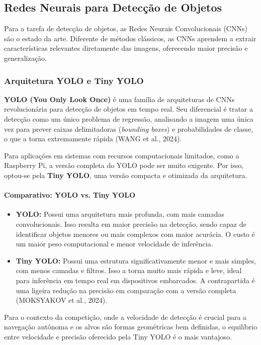 \documentclass{SBCbookchapter}
\begin{document}
\subsection{Redes Neurais para Detecção de Objetos}
Para a tarefa de detecção de objetos, as Redes Neurais Convolucionais (CNNs) são o estado da arte. Diferente de métodos clássicos, as CNNs aprendem a extrair características relevantes diretamente das imagens, oferecendo maior precisão e generalização.

\subsubsection{Arquitetura YOLO e Tiny YOLO}
\textbf{YOLO (You Only Look Once)} é uma família de arquiteturas de CNNs revolucionária para detecção de objetos em tempo real. Seu diferencial é tratar a detecção como um único problema de regressão, analisando a imagem uma única vez para prever caixas delimitadoras (\textit{bounding boxes}) e probabilidades de classe, o que a torna extremamente rápida (WANG et al., 2024).

Para aplicações em sistemas com recursos computacionais limitados, como a Raspberry Pi, a versão completa do YOLO pode ser muito exigente. Por isso, optou-se pela \textbf{Tiny YOLO}, uma versão compacta e otimizada da arquitetura.

\paragraph{Comparativo: YOLO vs. Tiny YOLO}
\begin{itemize}
    \item \textbf{YOLO:} Possui uma arquitetura mais profunda, com mais camadas convolucionais. Isso resulta em maior precisão na detecção, sendo capaz de identificar objetos menores ou mais complexos com maior acurácia. O custo é um maior peso computacional e menor velocidade de inferência.
    \item \textbf{Tiny YOLO:} Possui uma estrutura significativamente menor e mais simples, com menos camadas e filtros. Isso a torna muito mais rápida e leve, ideal para inferência em tempo real em dispositivos embarcados. A contrapartida é uma ligeira redução na precisão em comparação com a versão completa (MOKSYAKOV et al., 2024).
\end{itemize}

Para o contexto da competição, onde a velocidade de detecção é crucial para a navegação autônoma e os alvos são formas geométricas bem definidas, o equilíbrio entre velocidade e precisão oferecido pela Tiny YOLO é o mais vantajoso.
\end{document}
